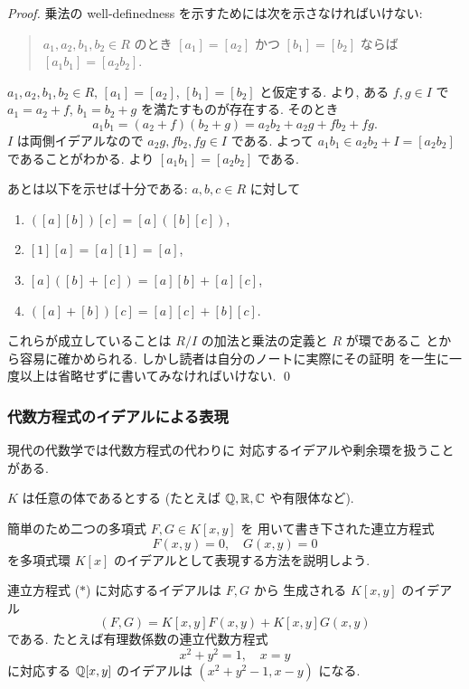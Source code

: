 \documentclass[12pt,twoside]{jarticle}
\begin{document}
\begin{proof}
 乗法の well-definedness を示すためには次を示さなければいけない:
 \begin{quote}
  $a_1,a_2,b_1,b_2\in R$ のとき %
  $[a_1]=[a_2]$ かつ $[b_1]=[b_2]$ ならば $[a_1b_1]=[a_2b_2]$.
 \end{quote}
 $a_1,a_2,b_1,b_2\in R$, $[a_1]=[a_2]$, $[b_1]=[b_2]$ と仮定する.
 より, 
 ある $f,g\in I$ で $a_1=a_2+f$, $b_1=b_2+g$ を満たすものが存在する.
 そのとき
 \begin{equation*}
  a_1b_1 = (a_2+f)(b_2+g) = a_2b_2 + a_2g + fb_2 + fg.
 \end{equation*}
 $I$ は両側イデアルなので $a_2g, fb_2, fg \in I$ である.
 よって $a_1b_1\in a_2b_2+I=[a_2b_2]$ であることがわかる.
 より $[a_1b_1]=[a_2b_2]$ である.

 あとは以下を示せば十分である: $a,b,c\in R$ に対して
 \begin{enumerate}
  \item $([a][b])[c]=[a]([b][c])$,
  \item $[1][a]=[a][1]=[a]$,
  \item $[a]([b]+[c])=[a][b]+[a][c]$,
  \item $([a]+[b])[c]=[a][c]+[b][c]$.
 \end{enumerate}
 これらが成立していることは $R/I$ の加法と乗法の定義と $R$ が環であるこ
 とから容易に確かめられる. しかし読者は自分のノートに実際にその証明
 を一生に一度以上は省略せずに書いてみなければいけない.
 \qed
\end{proof}

\subsubsection{代数方程式のイデアルによる表現}

現代の代数学では代数方程式の代わりに
対応するイデアルや剰余環を扱うことがある.

$K$ は任意の体であるとする
(たとえば ${\mathbb Q}, {\mathbb R}, {\mathbb C}$ や有限体など).

簡単のため二つの多項式 $F,G\in K[x,y]$ を
用いて書き下された連立方程式
\begin{equation*}
  F(x,y) = 0, \quad G(x,y) = 0
  \tag{$*$}
\end{equation*}
を多項式環 $K[x]$ のイデアルとして表現する方法を説明しよう.

連立方程式 ($*$) に対応するイデアルは $F,G$ から
生成される $K[x,y]$ のイデアル 
\begin{equation*}
 (F,G)=K[x,y]F(x,y)+K[x,y]G(x,y)
\end{equation*}
である.  たとえば有理数係数の連立代数方程式
\begin{equation*}
 x^2+y^2=1, \quad  x = y
 \tag{1}
\end{equation*}
に対応する ${\mathbb Q}[x,y]$ のイデアルは $(x^2+y^2-1, x-y)$ になる.
\end{document}
